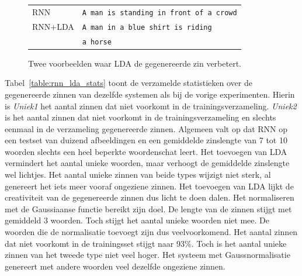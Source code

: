 \begin{figure}
\begin{minipage}[t]{.3\textwidth}
	\end{minipage}\hfill
	\begin{minipage}[t]{.7\textwidth}
		\vspace{0pt}
		\begin{tabular}{ll}
			RNN & \texttt{A man is standing in front of a crowd} \\
			RNN+LDA & \texttt{A man in a blue shirt is riding}\\
			~ & \texttt{a horse} \\
		\end{tabular}
	\end{minipage}
	\caption{Twee voorbeelden waar LDA de gegenereerde zin verbetert.}
	\label{fig:ldaguide}
\end{figure}

Tabel~\ref{table:rnn_lda_stats} toont de verzamelde statistieken over de gegenereerde zinnen van dezelfde systemen als bij de vorige experimenten. Hierin is \emph{Uniek1} het aantal zinnen dat niet voorkomt in de trainingsverzameling. \emph{Uniek2} is het aantal zinnen dat niet voorkomt in de trainingsverzameling en slechts eenmaal in de verzameling gegenereerde zinnen.
Algemeen valt op dat RNN op een testset van duizend afbeeldingen en een gemiddelde zinslengte van 7 tot 10 woorden slechts een heel beperkte woordenschat leert.
Het toevoegen van LDA vermindert het aantal unieke woorden, maar verhoogt de gemiddelde zinslengte wel lichtjes. Het aantal unieke zinnen van beide types wijzigt niet sterk, al genereert het iets meer vooraf ongeziene zinnen. Het toevoegen van LDA lijkt de creativiteit van de gegenereerde zinnen dus licht te doen dalen.
Het normaliseren met de Gaussiaanse functie bereikt zijn doel. De lengte van de zinnen stijgt met gemiddeld 3 woorden. Toch stijgt het aantal unieke woorden niet mee. De woorden die de normalisatie toevoegt zijn dus veelvoorkomend. Het aantal zinnen dat niet voorkomt in de trainingsset stijgt naar 93\%. Toch is het aantal unieke zinnen van het tweede type niet veel hoger. Het systeem met Gaussnormalisatie genereert met andere woorden veel dezelfde ongeziene zinnen.

